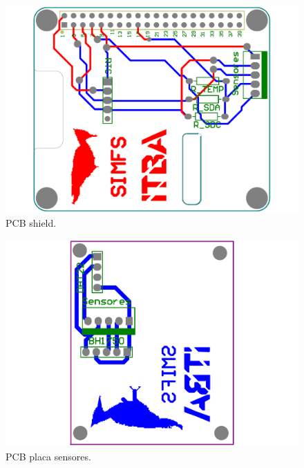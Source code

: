 

\begin{figure}[H]
	\centering
	\includegraphics[width=\linewidth, page=1]{ImagenesApendice/PCBShield}
	\caption{PCB shield.}
	\label{fig:shield}
\end{figure}
\begin{figure}[H]
	\centering
	\includegraphics[width=\linewidth, page=1]{ImagenesApendice/PCBSensores}
	\caption{PCB placa sensores.}
	\label{fig:sensores}
\end{figure}